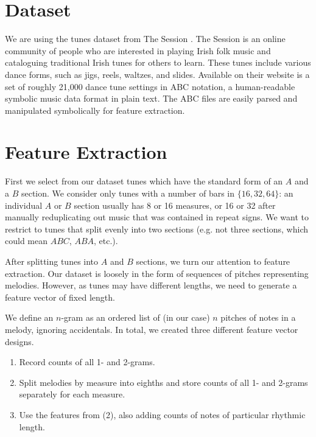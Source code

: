 \documentclass{article} %
\begin{document}
\section{Dataset}

We are using the tunes dataset from The Session \cite{thesession}. The
Session is an online community of people who are interested in playing Irish
folk music and cataloguing traditional Irish tunes for others to learn. These
tunes include various dance forms, such as jigs, reels, waltzes, and slides.
Available on their website is a set of roughly 21,000 dance tune settings
in ABC notation, a human-readable symbolic music data format in plain text. The
ABC files are easily parsed and manipulated symbolically for feature extraction.

\section{Feature Extraction}

First we select from our dataset tunes which have the standard form of an $A$
and a $B$ section. We consider only tunes with a number of bars in $\{16, 32,
64\}$: an individual $A$ or $B$ section usually has 8 or 16 measures, or 16 or
32 after manually reduplicating out music that was contained in repeat signs. We
want to restrict to tunes that split evenly into two sections (e.g.  not three
sections, which could mean $ABC$, $ABA$, etc.).

After splitting tunes into $A$ and $B$ sections, we turn our attention to
feature extraction.  Our dataset is loosely in the form of sequences of pitches
representing melodies. However, as tunes may have different lengths, we need to
generate a feature vector of fixed length.

We define an $n$-gram as an ordered list of (in our case) $n$ pitches of notes
in a melody, ignoring accidentals. In total, we created three different feature
vector designs.
\begin{enumerate}
\item Record counts of all 1- and 2-grams.

\item Split melodies by measure into eighths and store counts of all 1- and
2-grams separately for each measure.

\item Use the features from (2), also adding counts of notes of particular
  rhythmic length.
\end{enumerate}
\end{document}
